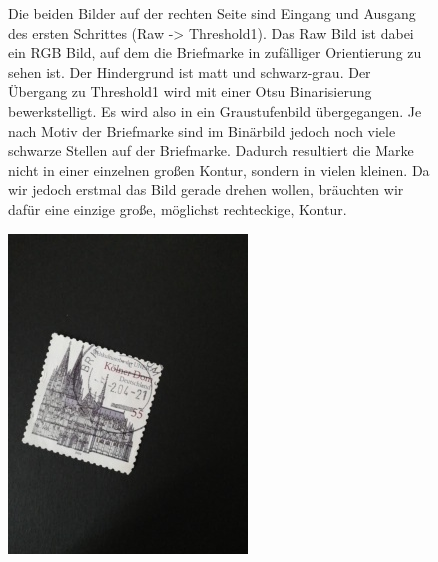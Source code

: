 \documentclass[12pt,toc=bib,toc=listof]{scrreprt}
\begin{document}
\begin{figure}[t]

\begin{minipage}[t]{.6\linewidth}
Die beiden Bilder auf der rechten Seite sind Eingang und Ausgang des ersten Schrittes (Raw -> Threshold1). Das Raw Bild ist dabei ein RGB Bild, auf dem die Briefmarke in zufälliger Orientierung zu sehen ist. Der Hindergrund ist matt und schwarz-grau. Der Übergang zu Threshold1 wird mit einer Otsu Binarisierung bewerkstelligt. Es wird also in ein Graustufenbild übergegangen. Je nach Motiv der Briefmarke sind im Binärbild jedoch noch viele schwarze Stellen auf der Briefmarke. Dadurch resultiert die Marke nicht in einer einzelnen großen Kontur, sondern in vielen kleinen. Da wir jedoch erstmal das Bild gerade drehen wollen, bräuchten wir dafür eine einzige große, möglichst rechteckige, Kontur.
\end{minipage}
\hspace{0.02\linewidth}
\begin{minipage}[t]{.2\linewidth}
  \strut\vspace*{-\baselineskip}\newline\includegraphics[width=\linewidth]{./bilder/start_dom}

\end{minipage}
\end{figure}
\end{document}
